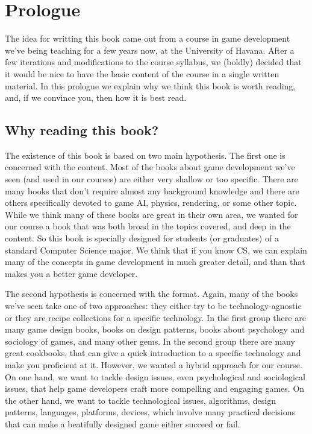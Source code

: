 \chapter*{Prologue}

The idea for writting this book came out from a course in game development we've being teaching
for a few years now, at the University of Havana. After a few iterations and modifications to
the course syllabus, we (boldly) decided that it would be nice to have the basic content of the
course in a single written material. In this prologue we explain why we think this book is
worth reading, and, if we convince you, then how it is best read.

\section*{Why reading this book?}

The existence of this book is based on two main hypothesis. The first one is concerned with the
content. Most of the books about game development we've seen (and used in our courses) are either
very shallow or too specific. There are many books that don't require almost any background knowledge
and there are others specifically devoted to game AI, physics, rendering, or some other topic.
While we think many of these books are great in their own area, we wanted for our course a book that
was both broad in the topics covered, and deep in the content. So this book is specially designed
for students (or graduates) of a standard Computer Science major. We think that if you know CS,
we can explain many of the concepts in game development in much greater detail, and than that
makes you a better game developer.

The second hypothesis is concerned with the format. Again, many of the books we've seen take one
of two approaches: they either try to be technology-agnostic or they are recipe collections for
a specific technology. In the first group there are many game design books, books on design patterns,
books about psychology and sociology of games, and many other gems. In the second group there
are many great cookbooks, that can give a quick introduction to a specific technology and
make you proficient at it. However, we wanted a hybrid approach for our course. On one hand,
we want to tackle design issues, even psychological and sociological issues, that help
game developers craft more compelling and engaging games. On the other hand, we want to tackle
technological issues, algorithms, design patterns, languages, platforms, devices, which involve
many practical decisions that can make a beatifully designed game either succeed or fail.

